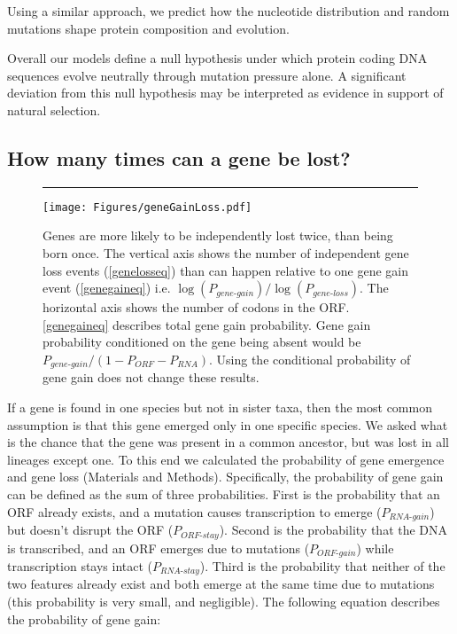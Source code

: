 \documentclass[12pt,a4paper]{article}
\begin{document}
Using a similar approach, we predict how the nucleotide distribution and random mutations shape protein composition and evolution. 

Overall our models define a null hypothesis under which protein coding DNA sequences evolve neutrally through mutation pressure alone. A significant deviation from this null hypothesis may be interpreted as evidence in support of natural selection. 

\subsection{How many times can a gene be lost?}

\begin{figure}[!b]
\hrule
\vspace{1ex}
\centering
\texttt{[image: Figures/geneGainLoss.pdf]}
\caption{Genes are more likely to be independently lost twice, than being born once. The vertical axis shows the number of independent gene loss events (\autoref{genelosseq}) than can happen relative to one gene gain event (\autoref{genegaineq}) i.e. $\log(P_\textit{gene-gain})/\log(P_\textit{gene-loss})$. The horizontal axis shows the number of codons in the ORF. \autoref{genegaineq} describes total gene gain probability. Gene gain probability conditioned on the gene being absent would be $P_\textit{gene-gain}/(1-P_\textit{ORF} - P_\textit{RNA})$. Using the conditional probability of gene gain does not change these results.}
\label{gainlossprob}
\end{figure}

If a gene is found in one species but not in sister taxa, then the most common assumption is that this gene emerged only in one specific species. We asked what is the chance that the gene was present in a common ancestor, but was lost in all lineages except one. To this end we calculated the probability of gene emergence and gene loss (Materials and Methods). Specifically, the probability of gene gain can be defined as the sum of three probabilities. First is the probability that an ORF already exists, and a mutation causes transcription to emerge ($P_\textit{RNA-gain}$) but doesn't disrupt the ORF ($P_\textit{ORF-stay}$). Second is the probability that the DNA is transcribed, and an ORF emerges due to mutations ($P_\textit{ORF-gain}$) while transcription stays intact ($P_\textit{RNA-stay}$). Third is the probability that neither of the two features already exist and both emerge at the same time due to mutations (this probability is very small, and negligible). The following equation describes the probability of gene gain:
\end{document}
